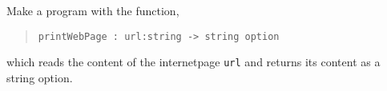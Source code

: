 Make a program with the function,
\begin{quote}
  \mbox{\lstinline!printWebPage : url:string -> string option!}
\end{quote}
which reads the content of the internetpage \lstinline!url! and
returns its content as a string option.
